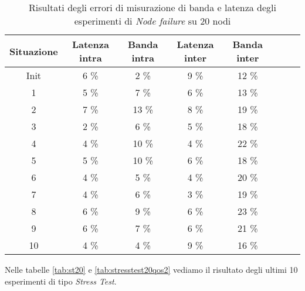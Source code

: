     \begin{table}[H]
    \caption{Risultati degli errori di misurazione di banda e latenza degli esperimenti di \textit{Node failure} su 20 nodi}
    \label{tab:linkfail20qos2}
    \begin{center}
        \begin{tabular}{|c|c|c|c|c|c|c|c|}
            \hline
            Situazione & Latenza intra & Banda intra & Latenza inter & Banda inter\\
            \hline
            Init & 6 \%   & 2 \%   & 9 \%   & 12 \%   \\
            1    & 5 \%   & 7 \%   & 6 \%   & 13 \%   \\
            2    & 7 \%   & 13 \%  & 8 \%   & 19 \%   \\
            3    & 2 \%   & 6 \%   & 5 \%   & 18 \%   \\
            4    & 4 \%   & 10 \%  & 4 \%   & 22 \%   \\
            5    & 5 \%   & 10 \%  & 6 \%   & 18 \%   \\
            6    & 4 \%   & 5 \%   & 4 \%   & 20 \%   \\
            7    & 4 \%   & 6 \%   & 3 \%   & 19 \%   \\
            8    & 6 \%   & 9 \%   & 6 \%   & 23 \%   \\
            9    & 6 \%   & 7 \%   & 6 \%   & 21 \%   \\
            10   & 4 \%   & 4 \%   & 9 \%   & 16 \%   \\
            \hline
        \end{tabular}
        \end{center}
    \end{table}
        Nelle tabelle \ref{tab:st20} e \ref{tab:stresstest20qos2} vediamo il risultato degli ultimi 10 esperimenti di tipo \textit{Stress Test}.
